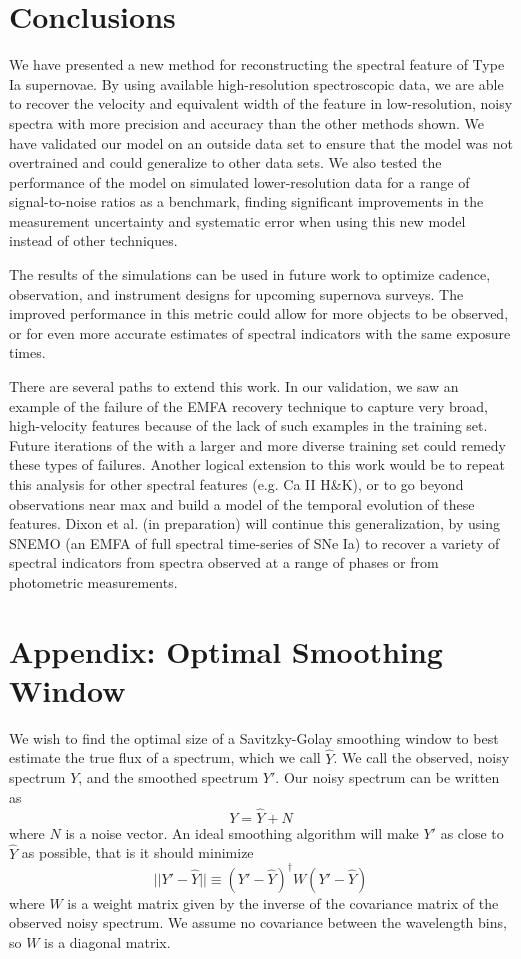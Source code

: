 \section{Conclusions}
\label{conclusions}
We have presented a new method for reconstructing the \siliconii\; spectral feature of Type Ia supernovae. By using available high-resolution spectroscopic data, we are able to recover the velocity and equivalent width of the feature in low-resolution, noisy spectra with more precision and accuracy than the other methods shown. We have validated our model on an outside data set to ensure that the model was not overtrained and could generalize to other data sets. We also tested the performance of the model on simulated lower-resolution data for a range of signal-to-noise ratios as a benchmark, finding significant improvements in the measurement uncertainty and systematic error when using this new model instead of other techniques.

The results of the simulations can be used in future work to optimize cadence, observation, and instrument designs for upcoming supernova surveys. The improved performance in this metric could allow for more objects to be observed, or for even more accurate estimates of spectral indicators with the same exposure times. 

There are several paths to extend this work. In our validation, we saw an example of the failure of the EMFA recovery technique to capture very broad, high-velocity features because of the lack of such examples in the training set. Future iterations of the with a larger and more diverse training set could remedy these types of failures. Another logical extension to this work would be to repeat this analysis for other spectral features (e.g. Ca II H\&K), or to go beyond observations near max and build a model of the temporal evolution of these features. Dixon et al. (in preparation) will continue this generalization, by using SNEMO \citep{saunders_improved_2018} (an EMFA of full spectral time-series of SNe Ia) to recover a variety of spectral indicators from spectra observed at a range of phases or from photometric measurements.

\section{Appendix: Optimal Smoothing Window}
\label{sg_optimal}
We wish to find the optimal size of a Savitzky-Golay smoothing window to best estimate the true flux of a spectrum, which we call $\hat{Y}$. We call the observed, noisy spectrum $Y$, and the smoothed spectrum $Y'$. Our noisy spectrum can be written as
\begin{equation}
    Y = \hat{Y}+N
\end{equation}
where $N$ is a noise vector. An ideal smoothing algorithm will make $Y'$ as close to $\hat{Y}$ as possible, that is it should minimize 
\begin{equation}
    ||Y'-\hat{Y}|| \equiv (Y'-\hat{Y})^\dagger W (Y'-\hat{Y})
\end{equation}
where $W$ is a weight matrix given by the inverse of the covariance matrix of the observed noisy spectrum. We assume no covariance between the wavelength bins, so $W$ is a diagonal matrix.

